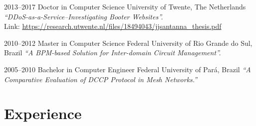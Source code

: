 \documentclass[print]{styles/friggeri-cv-mac} %
\begin{document}
\begin{entrylist}

\entry
{2013--2017}
{Doctor {\normalfont in Computer Science}}
{University of Twente, The Netherlands}
{\emph{``DDoS-as-a-Service--Investigating Booter Websites''.} \\
	Link: \href{https://research.utwente.nl/files/18494043/jjsantanna\_thesis.pdf}{https://research.utwente.nl/files/18494043/jjsantanna\_thesis.pdf}
}

\entry
{2010--2012}
{Master {\normalfont in Computer Science}}
{Federal University of Rio Grande do Sul, Brazil}
{\emph{``A BPM-based Solution for Inter-domain Circuit Management''.}\\
}

\entry
{2005--2010}
{Bachelor {\normalfont in Computer Engineer}}
{Federal University of Par\'a, Brazil}
{\emph{``A Comparative Evaluation of DCCP Protocol in Mesh Networks.''} \\ 
}

\end{entrylist}

\section{Experience}\vspace{-5pt}
\end{document}
